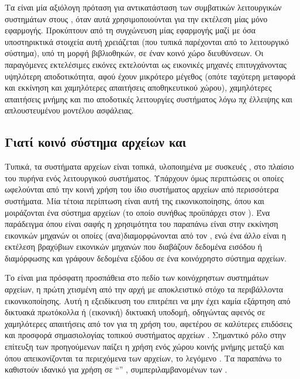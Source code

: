 Τα  είναι μία αξιόλογη πρόταση για αντικατάσταση των συμβατικών
λειτουργικών συστημάτων στους , όταν αυτά χρησιμοποιούνται για την
εκτέλεση μίας μόνο εφαρμογής. Προκύπτουν από τη συγχώνευση μίας εφαρμογής μαζί
με όσα υποστηρικτικά στοιχεία αυτή χρειάζεται (που τυπικά παρέχονται από το
λειτουργικό σύστημα), υπό τη μορφή βιβλιοθηκών, σε έναν κοινό χώρο διευθύνσεων.
Οι παραγόμενες εκτελέσιμες εικόνες εκτελούνται ως εικονικές μηχανές
επιτυγχάνοντας υψηλότερη αποδοτικότητα, αφού έχουν μικρότερο μέγεθος (οπότε
ταχύτερη μεταφορά και εκκίνηση \cite{jitsu} και χαμηλότερες απαιτήσεις
αποθηκευτικού χώρου), χαμηλότερες απαιτήσεις μνήμης και πιο αποδοτικές
λειτουργίες συστήματος λόγω πχ έλλειψης  και απλουστευμένου
μοντέλου ασφάλειας.

\subsection{Γιατί κοινό σύστημα αρχείων και \viofs{}}
Τυπικά, τα συστήματα αρχείων είναι τοπικά, υλοποιημένα με συσκευές ,
στο πλαίσιο του πυρήνα ενός λειτουργικού συστήματος. Υπάρχουν όμως περιπτώσεις
οι οποίες ωφελούνται από την κοινή χρήση του ίδιο συστήματος αρχείων από
περισσότερα συστήματα. Μία τέτοια περίπτωση είναι αυτή της εικονικοποίησης, όπου
\host{} και \guest{} μοιράζονται ένα σύστημα αρχείων (το οποίο συνήθως
προϋπάρχει στον \host{}). Ένα παράδειγμα όπου είναι σαφής η χρησιμότητα του
παραπάνω είναι στην εκκίνηση εικονικών μηχανών οι οποίες (ανα)διαμορφώνονται από
τον \host{}, ενώ ένα άλλο είναι η εκτέλεση βραχύβιων εικονικών μηχανών που
διαβάζουν δεδομένα εισόδου ή διαμόρφωσης και γράφουν δεδομένα εξόδου σε ένα
κοινόχρηστο σύστημα αρχείων.

Το \viofs{} είναι μια πρόσφατη προσπάθεια στο πεδίο των κοινόχρηστων συστημάτων
αρχείων, η πρώτη χτισμένη από την αρχή με αποκλειστικό στόχο τα περιβάλλοντα
εικονικοποίησης. Αυτή η εξειδίκευση του επιτρέπει να μην έχει καμία εξάρτηση
από δικτυακά πρωτόκολλα ή (εικονική) δικτυακή υποδομή, οδηγώντας αφενός σε
χαμηλότερες απαιτήσεις από τον \guest{} για τη χρήση του, αφετέρου σε καλύτερες
επιδόσεις και προσφορά σημασιολογίας τοπικού συστήματος αρχείων
\cite{virtiofs-website}. Σημαντικό ρόλο στην επίτευξη των προηγούμενων παίζει η
χρήση ενός χώρου κοινής μνήμης μεταξύ \host{} και \guest{} όπου απεικονίζονται
τα περιεχόμενα των αρχείων, το λεγόμενο . Τα
παραπάνω το καθιστούν ιδανικό για χρήση σε ``'' ,
συμπεριλαμβανομένων των .

